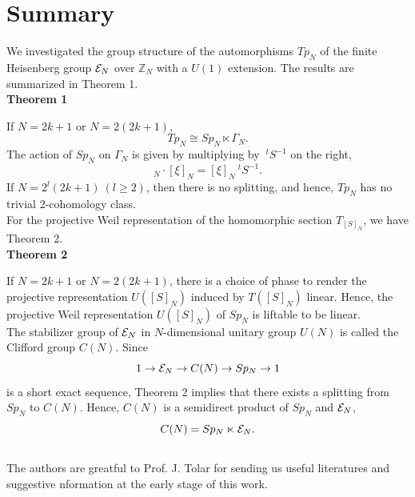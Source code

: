 \documentclass[12pt]{iopart}
\begin{document}
\section{Summary}

We investigated the group structure of the automorphisms \(Tp_N\)
of the finite Heisenberg group \({\cal E}_N\) over \(\mathbb Z_N\)
with a \(U(1)\) extension. The results are summarized in Theorem 1.
\\

\noindent
{\bf Theorem 1}
\vspace{2mm}

If \(N=2k+1\) or \(N=2(2k+1)\),
\begin{equation}
Tp_N\cong Sp_N\ltimes\Gamma_N.
\end{equation}
The action of \(Sp_N\) on \(\Gamma_N\) is given by multiplying
by \(\ ^tS^{-1}\) on the right,
\begin{equation}
[S]_N\cdot[\xi]_N=[\xi]_N\ ^tS^{-1}.
\end{equation}
If \(N=2^l(2k+1)\ (l\ge2)\), then there is no splitting, and hence,
\(Tp_N\) has no trivial 2-cohomology class.
\\

For the projective Weil representation of the homomorphic section \(T_{[S]_N}\),
we have Theorem 2.
\\

\noindent
{\bf Theorem 2}
\vspace{2mm}

If \(N=2k+1\) or \(N=2(2k+1)\), there is a choice of phase to render
the projective representation \(U([S]_N)\) induced by \(T([S]_N)\) linear.
Hence, the projective Weil representation \(U([S]_N)\) of \(Sp_N\) is liftable to be linear.
\\

The stabilizer group of \({\cal E}_N\) in \(N\)-dimensional unitary group \(U(N)\)
is called the Clifford group \(C(N)\).
Since
\begin{equation}
1\rightarrow{\cal E}_N\rightarrow C(N)\rightarrow Sp_N\rightarrow1
\end{equation}
is a short exact sequence,
Theorem 2 implies that there exists a splitting from \(Sp_N\) to \(C(N)\).
Hence, \(C(N)\) is a semidirect product of \(Sp_N\) and \({\cal E}_N\),
\begin{equation}
C(N)=Sp_N\ltimes{\cal E}_N.
\end{equation}
\ \\

\ack
The authors are greatful to Prof. J. Tolar for sending us useful
literatures and suggestive nformation at the early stage of this work.
\end{document}
